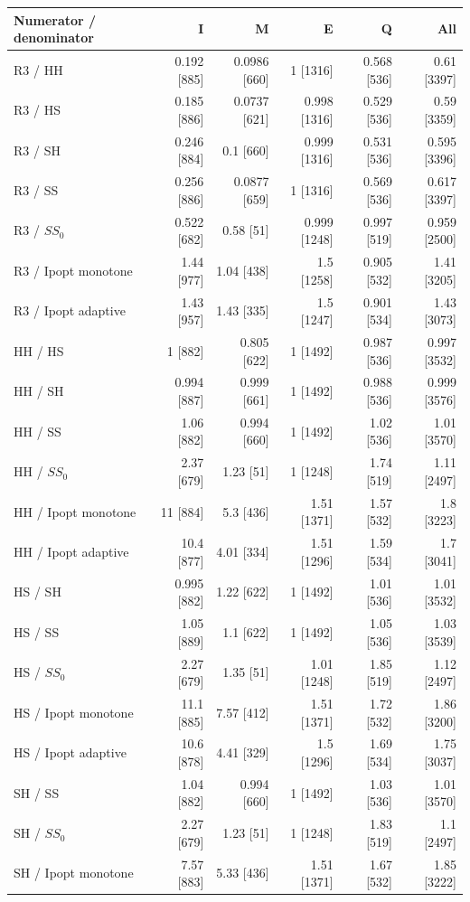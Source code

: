 \begin{tabular}{@{}lrrrrr@{}}
\toprule
Numerator / denominator & I & M & E & Q & All\\
\midrule
R3 / HH & 0.192 [885] & 0.0986 [660] & 1 [1316] & 0.568 [536] & 0.61 [3397]\\
R3 / HS & 0.185 [886] & 0.0737 [621] & 0.998 [1316] & 0.529 [536] & 0.59 [3359]\\
R3 / SH & 0.246 [884] & 0.1 [660] & 0.999 [1316] & 0.531 [536] & 0.595 [3396]\\
R3 / SS & 0.256 [886] & 0.0877 [659] & 1 [1316] & 0.569 [536] & 0.617 [3397]\\
R3 / $SS_0$ & 0.522 [682] & 0.58 [51] & 0.999 [1248] & 0.997 [519] & 0.959 [2500]\\
R3 / Ipopt monotone & 1.44 [977] & 1.04 [438] & 1.5 [1258] & 0.905 [532] & 1.41 [3205]\\
R3 / Ipopt adaptive & 1.43 [957] & 1.43 [335] & 1.5 [1247] & 0.901 [534] & 1.43 [3073]\\
HH / HS & 1 [882] & 0.805 [622] & 1 [1492] & 0.987 [536] & 0.997 [3532]\\
HH / SH & 0.994 [887] & 0.999 [661] & 1 [1492] & 0.988 [536] & 0.999 [3576]\\
HH / SS & 1.06 [882] & 0.994 [660] & 1 [1492] & 1.02 [536] & 1.01 [3570]\\
HH / $SS_0$ & 2.37 [679] & 1.23 [51] & 1 [1248] & 1.74 [519] & 1.11 [2497]\\
HH / Ipopt monotone & 11 [884] & 5.3 [436] & 1.51 [1371] & 1.57 [532] & 1.8 [3223]\\
HH / Ipopt adaptive & 10.4 [877] & 4.01 [334] & 1.51 [1296] & 1.59 [534] & 1.7 [3041]\\
HS / SH & 0.995 [882] & 1.22 [622] & 1 [1492] & 1.01 [536] & 1.01 [3532]\\
HS / SS & 1.05 [889] & 1.1 [622] & 1 [1492] & 1.05 [536] & 1.03 [3539]\\
HS / $SS_0$ & 2.27 [679] & 1.35 [51] & 1.01 [1248] & 1.85 [519] & 1.12 [2497]\\
HS / Ipopt monotone & 11.1 [885] & 7.57 [412] & 1.51 [1371] & 1.72 [532] & 1.86 [3200]\\
HS / Ipopt adaptive & 10.6 [878] & 4.41 [329] & 1.5 [1296] & 1.69 [534] & 1.75 [3037]\\
SH / SS & 1.04 [882] & 0.994 [660] & 1 [1492] & 1.03 [536] & 1.01 [3570]\\
SH / $SS_0$ & 2.27 [679] & 1.23 [51] & 1 [1248] & 1.83 [519] & 1.1 [2497]\\
SH / Ipopt monotone & 7.57 [883] & 5.33 [436] & 1.51 [1371] & 1.67 [532] & 1.85 [3222]\\

\end{tabular}
